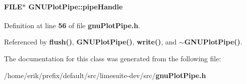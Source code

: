 \paragraph[{pipe\+Handle}]{\setlength{\rightskip}{0pt plus 5cm}F\+I\+LE$\ast$ G\+N\+U\+Plot\+Pipe\+::pipe\+Handle\hspace{0.3cm}{\ttfamily [protected]}}\label{classGNUPlotPipe_ac77a2277bdd35725a7062a584050d4c2}


Definition at line {\bf 56} of file {\bf gnu\+Plot\+Pipe.\+h}.



Referenced by {\bf flush()}, {\bf G\+N\+U\+Plot\+Pipe()}, {\bf write()}, and {\bf $\sim$\+G\+N\+U\+Plot\+Pipe()}.



The documentation for this class was generated from the following file\+:\begin{DoxyCompactItemize}
\item 
/home/erik/prefix/default/src/limesuite-\/dev/src/{\bf gnu\+Plot\+Pipe.\+h}\end{DoxyCompactItemize}
